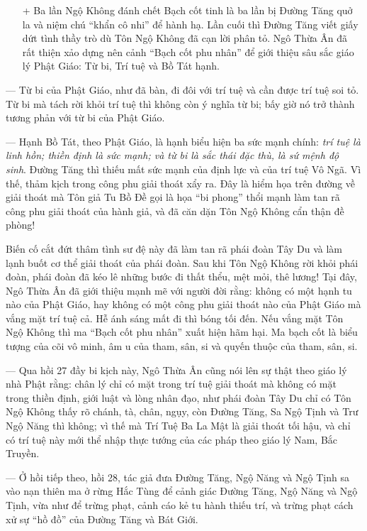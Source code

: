 \begin{enumerate}[label=\itshape\arabic*\upshape/]
   \item[+] Ba lần Ngộ Không đánh chết Bạch cốt tinh là ba lần bị Đường Tăng quở la và niệm chú ``khẩn cô nhi'' để hành hạ. Lần cuối thì Đường Tăng viết giấy dứt tình thầy trò dù Tôn Ngộ Không đã cạn lời phân tỏ. Ngô Thừa Ân đã rất thiện xảo dựng nên cảnh ``Bạch cốt phu nhân'' để giới thiệu sâu sắc giáo lý Phật Giáo: Từ bi, Trí tuệ và Bồ Tát hạnh.
\end{enumerate}

--- Từ bi của Phật Giáo, như đã bàn, đi đôi với trí tuệ và cần được trí tuệ soi tỏ. Từ bi mà tách rời khỏi trí tuệ thì không còn ý nghĩa từ bi; bấy giờ nó trở thành tương phản với từ bi của Phật Giáo.

--- Hạnh Bồ Tát, theo Phật Giáo, là hạnh biểu hiện ba sức mạnh chính: \emph{trí tuệ là linh hồn; thiền định là sức mạnh; và từ bi là sắc thái đặc thù, là sứ mệnh độ sinh}. Đường Tăng thì thiếu mất sức mạnh của định lực và của trí tuệ Vô Ngã. Vì thế, thảm kịch trong công phu giải thoát xẩy ra. Đây là hiểm họa trên đường về giải thoát mà Tôn giả Tu Bồ Đề gọi là họa ``bi phong'' thổi mạnh làm tan rã công phu giải thoát của hành giả, và đã căn dặn Tôn Ngộ Không cẩn thận đề phòng!

Biến cố cắt đứt thâm tình sư đệ này đã làm tan rã phái đoàn Tây Du và làm lạnh buốt cơ thể giải thoát của phái đoàn. Sau khi Tôn Ngộ Không rời khỏi phái đoàn, phái đoàn đã kéo lê những bước đi thất thểu, mệt mỏi, thê lương! Tại đây, Ngô Thừa Ân đã giới thiệu mạnh mẽ với người đời rằng: không có một hạnh tu nào của Phật Giáo, hay không có một công phu giải thoát nào của Phật Giáo mà vắng mặt trí tuệ cả. Hễ ánh sáng mất đi thì bóng tối đến. Nếu vắng mặt Tôn Ngộ Không thì ma ``Bạch cốt phu nhân'' xuất hiện hãm hại. Ma bạch cốt là biểu tượng của cõi vô minh, âm u của tham, sân, si và quyến thuộc của tham, sân, si.

--- Qua hồi 27 đầy bi kịch này, Ngô Thừa Ân cũng nói lên sự thật theo giáo lý nhà Phật rằng: chân lý chỉ có mặt trong trí tuệ giải thoát mà không có mặt trong thiền định, giới luật và lòng nhân đạo, như phái đoàn Tây Du chỉ có Tôn Ngộ Không thấy rõ chánh, tà, chân, ngụy, còn Đường Tăng, Sa Ngộ Tịnh và Trư Ngộ Năng thì không; vì thế mà Trí Tuệ Ba La Mật là giải thoát tối hậu, và chỉ có trí tuệ này mới thể nhập thực tướng của các pháp theo giáo lý Nam, Bắc Truyền.

--- Ở hồi tiếp theo, hồi 28, tác giả đưa Đường Tăng, Ngộ Năng và Ngộ Tịnh sa vào nạn thiên ma ở rừng Hắc Tùng để cảnh giác Đường Tăng, Ngộ Năng và Ngộ Tịnh, vừa như để trừng phạt, cảnh cáo kẻ tu hành thiếu trí, và trừng phạt cách xử sự ``hồ đồ'' của Đường Tăng và Bát Giới.


